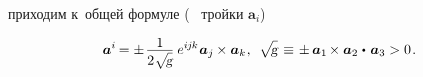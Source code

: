 \begin{otherlanguage}{russian}

\vspace{-1.3em}\noindent
приходим к~общей формуле
(~\inquotes{$-$}
 тройки ${\bm{a}_i}$)

\nopagebreak\begin{equation}\label{basisvectorstocobasisvectors}
\bm{a}^{i} \hspace{-0.2ex}
= \displaystyle \pm \hspace{.2ex} \frac{\raisemath{-0.4ex}{1}}{2 \hspace{.1ex} \scalebox{0.95}[0.96]{$\sqrt{\hspace{-0.36ex}\mathstrut{\textsl{g}}}$}} \hspace{.5ex} e^{i\hspace{-0.1ex}j\hspace{-0.1ex}k} \hspace{.1ex} \bm{a}_j \hspace{-0.1ex} \times \bm{a}_k \hspace{.1ex},
\:\:
\sqrt{\hspace{-0.36ex}\mathstrut{\textsl{g}}} \hspace{.25ex}
\equiv \hspace{.15ex} \pm \hspace{.4ex} \bm{a}_1 \hspace{-0.2ex} \times \bm{a}_2 \hspace{.1ex} \dotp \hspace{.25ex} \bm{a}_3
> 0
\hspace{.2ex} .
\end{equation}


\end{otherlanguage}
